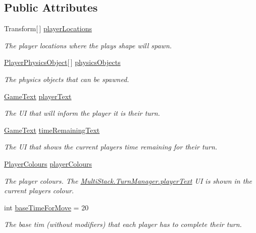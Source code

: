 \subsection*{Public Attributes}
\begin{DoxyCompactItemize}
\item 
Transform\mbox{[}$\,$\mbox{]} \hyperlink{class_multi_stack_1_1_turn_manager_a4693285de295363939a9f454ac6a5e5b}{player\+Locations}
\begin{DoxyCompactList}\small\item\em The player locations where the plays shape will spawn. \end{DoxyCompactList}\item 
\hyperlink{struct_multi_stack_1_1_player_physics_object}{Player\+Physics\+Object}\mbox{[}$\,$\mbox{]} \hyperlink{class_multi_stack_1_1_turn_manager_a4c217abcf3dd22bc5aa3908aa68c0df3}{physics\+Objects}
\begin{DoxyCompactList}\small\item\em The physics objects that can be spawned. \end{DoxyCompactList}\item 
\hyperlink{class_multi_stack_1_1_game_text}{Game\+Text} \hyperlink{class_multi_stack_1_1_turn_manager_a498a14eba4b58bc373456efba57302fa}{player\+Text}
\begin{DoxyCompactList}\small\item\em The U\+I that will inform the player it is their turn. \end{DoxyCompactList}\item 
\hyperlink{class_multi_stack_1_1_game_text}{Game\+Text} \hyperlink{class_multi_stack_1_1_turn_manager_a2084e64bcf723c4d9d46960f18c26368}{time\+Remaining\+Text}
\begin{DoxyCompactList}\small\item\em The U\+I that shows the current players time remaining for their turn. \end{DoxyCompactList}\item 
\hyperlink{class_multi_stack_1_1_player_colours}{Player\+Colours} \hyperlink{class_multi_stack_1_1_turn_manager_a21fba5ca2fc616a5f1dde0676ba9f5f2}{player\+Colours}
\begin{DoxyCompactList}\small\item\em The player colours. The \hyperlink{class_multi_stack_1_1_turn_manager_a498a14eba4b58bc373456efba57302fa}{Multi\+Stack.\+Turn\+Manager.\+player\+Text} U\+I is shown in the current players colour. \end{DoxyCompactList}\item 
int \hyperlink{class_multi_stack_1_1_turn_manager_aac198a78f07eea0eae4e12fe100ea043}{base\+Time\+For\+Move} = 20
\begin{DoxyCompactList}\small\item\em The base tim (without modifiers) that each player has to complete their turn. \end{DoxyCompactList}\end{DoxyCompactItemize}
